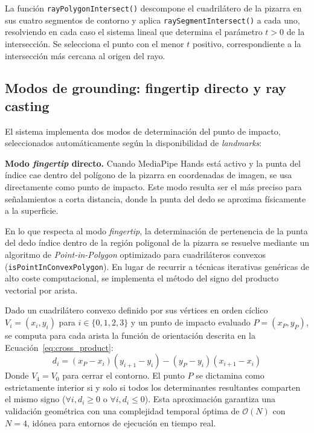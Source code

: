 \documentclass[12pt]{report} %
\begin{document}
La función \texttt{rayPolygonIntersect()} descompone el cuadrilátero de la pizarra en sus cuatro segmentos de contorno y aplica \texttt{raySegmentIntersect()} a cada uno, resolviendo en cada caso el sistema lineal que determina el parámetro $t > 0$ de la intersección. Se selecciona el punto con el menor $t$ positivo, correspondiente a la intersección más cercana al origen del rayo.

\subsection{Modos de grounding: fingertip directo y ray casting}

El sistema implementa dos modos de determinación del punto de impacto, seleccionados automáticamente según la disponibilidad de \textit{landmarks}:

\textbf{Modo \textit{fingertip} directo.} Cuando MediaPipe Hands está activo y la punta del índice cae dentro del polígono de la pizarra en coordenadas de imagen, se usa directamente como punto de impacto. Este modo resulta ser el más preciso para señalamientos a corta distancia, donde la punta del dedo se aproxima físicamente a la superficie.

En lo que respecta al modo \textit{fingertip}, la determinación de pertenencia de la punta del dedo índice dentro de la región poligonal de la pizarra se resuelve mediante un algoritmo de \textit{Point-in-Polygon} optimizado para cuadriláteros convexos (\texttt{isPointInConvexPolygon}). En lugar de recurrir a técnicas iterativas genéricas de alto coste computacional, se implementa el método del signo del producto vectorial por arista. 

Dado un cuadrilátero convexo definido por sus vértices en orden cíclico $V_i = (x_i, y_i)$ para $i \in \{0, 1, 2, 3\}$ y un punto de impacto evaluado $P = (x_P, y_P)$, se computa para cada arista la función de orientación descrita en la Ecuación~\ref{eq:cross_product}:
\begin{equation}
\label{eq:cross_product}
d_i = (x_P - x_i)(y_{i+1} - y_i) - (y_P - y_i)(x_{i+1} - x_i)
\end{equation}
Donde $V_4 = V_0$ para cerrar el contorno. El punto $P$ se dictamina como estrictamente interior si y solo si todos los determinantes resultantes comparten el mismo signo ($\forall i, d_i \ge 0$ o $\forall i, d_i \le 0$). Esta aproximación garantiza una validación geométrica con una complejidad temporal óptima de $\mathcal{O}(N)$ con $N=4$, idónea para entornos de ejecución en tiempo real.
\end{document}
